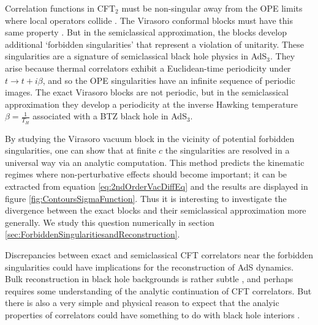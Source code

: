 \documentclass[12pt]{article}
\numberwithin{equation}{section}
\begin{document}
Correlation functions  in CFT$_2$ must be non-singular away from the OPE limits where local operators collide \cite{Maldacena:2015iua, Fitzpatrick:2016ive}.  The Virasoro conformal blocks must have this same property \cite{Fitzpatrick:2016mjq}.  But in the semiclassical approximation, the blocks develop additional `forbidden singularities' \cite{Fitzpatrick:2016ive} that represent a violation of unitarity.  These singularities are a signature of semiclassical black hole physics in AdS$_3$.  They arise because thermal correlators exhibit a Euclidean-time periodicity under $t \to t + i \beta$,  and so the OPE singularities have an infinite sequence of periodic images.  The exact Virasoro blocks  are not periodic, but in the semiclassical approximation they develop a periodicity at the inverse Hawking temperature $\beta = \frac{1}{T_H}$ associated with a BTZ black hole  in AdS$_3$.

By studying the Virasoro vacuum block in the vicinity of potential forbidden singularities, one can show that at finite $c$ the singularities are resolved in a universal way \cite{Fitzpatrick:2016ive} via an analytic computation.   This method predicts the kinematic regimes where non-perturbative effects should become important; it can be extracted from equation \ref{eq:2ndOrderVacDiffEq} and the results are displayed in figure \ref{fig:ContoursSigmaFunction}.  Thus it is interesting to investigate the divergence between the exact blocks and their semiclassical approximation more generally.  We study this question numerically in section \ref{sec:ForbiddenSingularitiesandReconstruction}. 

Discrepancies between exact and semiclassical CFT correlators near the forbidden singularities could have implications for the reconstruction of AdS dynamics.  Bulk reconstruction in black hole backgrounds is rather subtle \cite{Hamilton:2005ju, Bousso:2012mh, Leichenauer:2013kaa, Morrison:2014jha}, and perhaps requires some understanding of the analytic continuation of CFT correlators.  But  there is also a very simple and physical reason to expect that the analyic properties of correlators could have something to do with black hole interiors \cite{Hamilton:2005ju}.  
\end{document}
